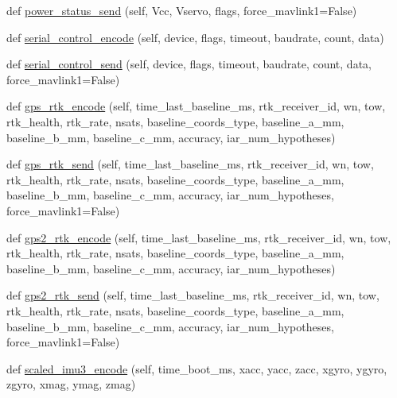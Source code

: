 \begin{DoxyCompactItemize}
\item 
def \hyperlink{classpymavlink_1_1dialects_1_1v10_1_1MAVLink_a7b8fed4069c44b36e6caec9d584f82f0}{power\+\_\+status\+\_\+send} (self, Vcc, Vservo, flags, force\+\_\+mavlink1=False)
\item 
def \hyperlink{classpymavlink_1_1dialects_1_1v10_1_1MAVLink_adcce854e40e5ac1fec5b82c989efea4c}{serial\+\_\+control\+\_\+encode} (self, device, flags, timeout, baudrate, count, data)
\item 
def \hyperlink{classpymavlink_1_1dialects_1_1v10_1_1MAVLink_ac2ee4dfbb45624639e95a905a098066f}{serial\+\_\+control\+\_\+send} (self, device, flags, timeout, baudrate, count, data, force\+\_\+mavlink1=False)
\item 
def \hyperlink{classpymavlink_1_1dialects_1_1v10_1_1MAVLink_a12c9142e6ee3e5ec7c7a52909b1c8336}{gps\+\_\+rtk\+\_\+encode} (self, time\+\_\+last\+\_\+baseline\+\_\+ms, rtk\+\_\+receiver\+\_\+id, wn, tow, rtk\+\_\+health, rtk\+\_\+rate, nsats, baseline\+\_\+coords\+\_\+type, baseline\+\_\+a\+\_\+mm, baseline\+\_\+b\+\_\+mm, baseline\+\_\+c\+\_\+mm, accuracy, iar\+\_\+num\+\_\+hypotheses)
\item 
def \hyperlink{classpymavlink_1_1dialects_1_1v10_1_1MAVLink_a380984eae38391d62d424fcaed6ea094}{gps\+\_\+rtk\+\_\+send} (self, time\+\_\+last\+\_\+baseline\+\_\+ms, rtk\+\_\+receiver\+\_\+id, wn, tow, rtk\+\_\+health, rtk\+\_\+rate, nsats, baseline\+\_\+coords\+\_\+type, baseline\+\_\+a\+\_\+mm, baseline\+\_\+b\+\_\+mm, baseline\+\_\+c\+\_\+mm, accuracy, iar\+\_\+num\+\_\+hypotheses, force\+\_\+mavlink1=False)
\item 
def \hyperlink{classpymavlink_1_1dialects_1_1v10_1_1MAVLink_a65d56c9b25cfb3c79a4dac1f88e18be7}{gps2\+\_\+rtk\+\_\+encode} (self, time\+\_\+last\+\_\+baseline\+\_\+ms, rtk\+\_\+receiver\+\_\+id, wn, tow, rtk\+\_\+health, rtk\+\_\+rate, nsats, baseline\+\_\+coords\+\_\+type, baseline\+\_\+a\+\_\+mm, baseline\+\_\+b\+\_\+mm, baseline\+\_\+c\+\_\+mm, accuracy, iar\+\_\+num\+\_\+hypotheses)
\item 
def \hyperlink{classpymavlink_1_1dialects_1_1v10_1_1MAVLink_a16ff394540825c7fadf4d444107b420e}{gps2\+\_\+rtk\+\_\+send} (self, time\+\_\+last\+\_\+baseline\+\_\+ms, rtk\+\_\+receiver\+\_\+id, wn, tow, rtk\+\_\+health, rtk\+\_\+rate, nsats, baseline\+\_\+coords\+\_\+type, baseline\+\_\+a\+\_\+mm, baseline\+\_\+b\+\_\+mm, baseline\+\_\+c\+\_\+mm, accuracy, iar\+\_\+num\+\_\+hypotheses, force\+\_\+mavlink1=False)
\item 
def \hyperlink{classpymavlink_1_1dialects_1_1v10_1_1MAVLink_aaeb40bdd6fcabcb90719d9f07e6bb522}{scaled\+\_\+imu3\+\_\+encode} (self, time\+\_\+boot\+\_\+ms, xacc, yacc, zacc, xgyro, ygyro, zgyro, xmag, ymag, zmag)

\end{DoxyCompactItemize}
